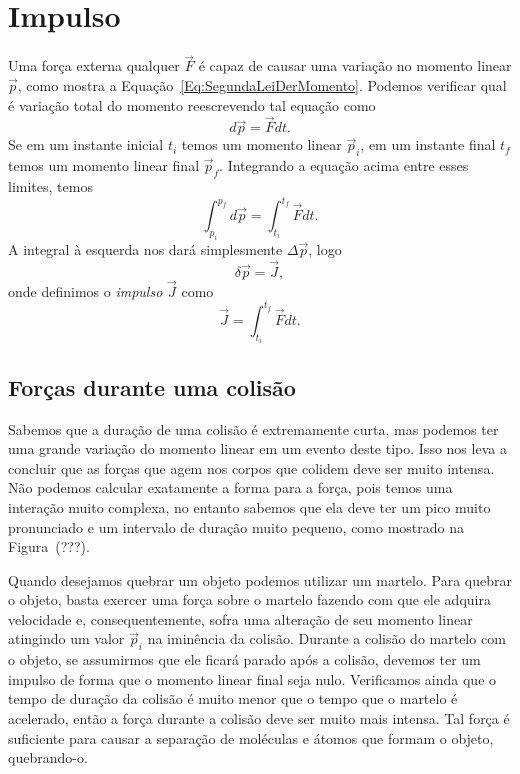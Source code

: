 
\section{Impulso}

Uma força externa qualquer $\vec{F}$ é capaz de causar uma variação no momento linear $\vec{p}$, como mostra a Equação~\eqref{Eq:SegundaLeiDerMomento}. Podemos verificar qual é variação total do momento reescrevendo tal equação como
\begin{equation}
  d\vec{p} = \vec{F} dt.
\end{equation}
%
Se em um instante inicial $t_i$ temos um momento linear $\vec{p}_i$, em um instante final $t_f$ temos um momento linear final $\vec{p}_f$. Integrando a equação acima entre esses limites, temos
\begin{equation}
  \int_{p_i}^{p_f} d\vec{p} = \int_{t_i}^{t_f} \vec{F} dt.
\end{equation}
%
A integral à esquerda nos dará simplesmente $\Delta\vec{p}$, logo
\begin{equation}
  \delta\vec{p} = \vec{J},
\end{equation}
%
onde definimos o \emph{impulso} $\vec{J}$ como
\begin{equation}
  \vec{J} = \int_{t_i}^{t_f} \vec{F} dt.
\end{equation}

\subsection{Forças durante uma colisão}

Sabemos que a duração de uma colisão é extremamente curta, mas podemos ter uma grande variação do momento linear em um evento deste tipo. Isso nos leva a concluir que as forças que agem nos corpos que colidem deve ser muito intensa. Não podemos calcular exatamente a forma para a força, pois temos uma interação muito complexa, no entanto sabemos que ela deve ter um pico muito pronunciado e um intervalo de duração muito pequeno, como mostrado na Figura~(???).

Quando desejamos quebrar um objeto podemos utilizar um martelo. Para quebrar o objeto, basta exercer uma força sobre o martelo fazendo com que ele adquira velocidade e, consequentemente, sofra uma alteração de seu momento linear atingindo um valor $\vec{p}_i$ na iminência da colisão. Durante a colisão do martelo com o objeto, se assumirmos que ele ficará parado após a colisão, devemos ter um impulso de forma que o momento linear final seja nulo. Verificamos ainda que o tempo de duração da colisão é muito menor que o tempo que o martelo é acelerado, então a força durante a colisão deve ser muito mais intensa. Tal força é suficiente para causar a separação de moléculas e átomos que formam o objeto, quebrando-o.

